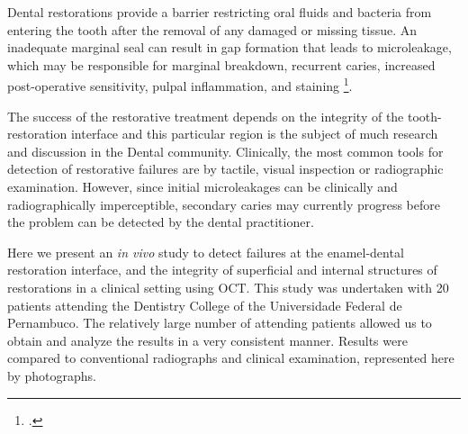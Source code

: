 \documentclass[12pt,twoside,english]{book}
\renewcommand{\~}{\perispomeni}%
\numberwithin{equation}{section}
\numberwithin{figure}{section}
\begin{document}

Dental restorations provide a barrier restricting oral fluids and bacteria from entering the tooth after the removal of any damaged or missing tissue. An inadequate marginal seal can result in gap formation that leads to microleakage, which may be responsible for marginal breakdown, recurrent caries, increased post-operative sensitivity, pulpal inflammation, and staining \footcite{Attar:2008p2147}.

The success of the restorative treatment depends on the integrity of the tooth-restoration interface and this particular region is the subject of much research and discussion in the Dental community. Clinically, the most common tools for detection of restorative failures are by tactile, visual inspection or radiographic examination. However, since initial microleakages can be clinically and radiographically imperceptible, secondary caries may currently progress before the problem can be detected by the dental practitioner.

Here we present an \emph{in vivo} study to detect failures at the enamel-dental restoration interface, and the integrity of superficial and internal structures of restorations in a clinical setting using OCT. This study was undertaken with 20 patients attending the Dentistry College of the Universidade Federal de Pernambuco. The relatively large number of attending patients allowed us to obtain and analyze the results in a very consistent manner. Results were compared to conventional radiographs and clinical examination, represented here by photographs. 
\end{document}
